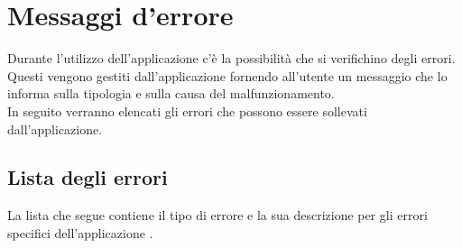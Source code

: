 \section{Messaggi d'errore} \label{err}
Durante l'utilizzo dell'applicazione \Premi c'è la possibilità che si verifichino degli errori.\\
Questi vengono gestiti dall'applicazione fornendo all'utente un messaggio che lo informa sulla tipologia e sulla causa del malfunzionamento.\\
In seguito verranno elencati gli errori che possono essere sollevati dall'applicazione.
\subsection{Lista degli errori}
La lista che segue contiene il tipo di errore e la sua descrizione per gli errori specifici dell'applicazione \Premi.
